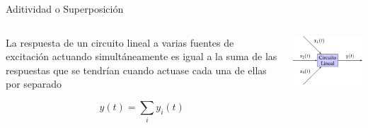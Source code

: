 \documentclass[aspectratio=169, usenames,svgnames,dvipsnames]{beamer}
\begin{document}
\begin{frame}[label={sec:org735732a}]{Aditividad o Superposición}
\begin{columns}
\begin{column}{0.5\columnwidth}
La respuesta de un \alert{circuito lineal} a varias fuentes de excitación actuando simultáneamente es igual a la suma de las respuestas que se tendrían cuando actuase cada una de ellas por separado

\[
y(t) = \sum_i y_i(t)
\]
\end{column}

\begin{column}{0.5\columnwidth}
\begin{center}
\includegraphics[width=.9\linewidth]{../figs/superposicion.pdf}
\end{center}
\end{column}
\end{columns}
\end{frame}
\end{document}
